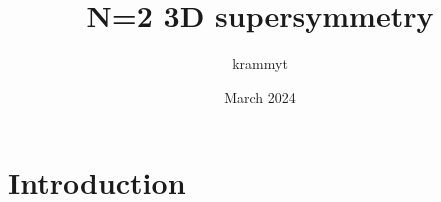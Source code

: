 \documentclass{article}
\title{N=2 3D supersymmetry}
\author{krammyt }
\date{March 2024}
\begin{document}
\maketitle

\section{Introduction}
\end{document}
